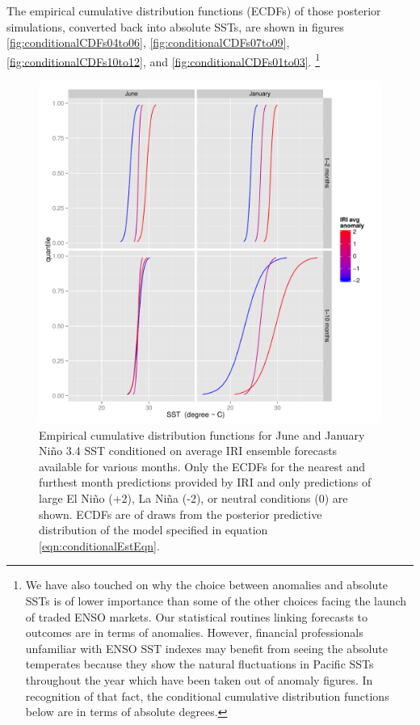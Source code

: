 \documentclass[authoryear]{article}
\begin{document}
The empirical cumulative distribution functions (ECDFs) of those posterior simulations, converted back into absolute SSTs, are shown in figures \ref{fig:conditionalCDFs04to06}, \ref{fig:conditionalCDFs07to09}, \ref{fig:conditionalCDFs10to12}, and \ref{fig:conditionalCDFs01to03}. \footnote{We have also touched on why the choice between anomalies and absolute SSTs is of lower importance than some of the other choices facing the launch of traded ENSO markets. Our statistical routines linking forecasts to outcomes are in terms of anomalies. However, financial professionals unfamiliar with ENSO SST indexes may benefit from seeing the absolute temperates because they show the natural fluctuations in Pacific SSTs throughout the year which have been taken out of anomaly figures. In recognition of that fact, the conditional cumulative distribution functions below are in terms of absolute degrees.}

\begin{figure}[!htbp]
  \includegraphics[width=\linewidth]{Pricingfigs/conditionalCDFsIllustrativeExamplesTradConfigSimple}
  \caption{Empirical cumulative distribution functions for June and January Ni\~no 3.4 SST conditioned on average IRI ensemble forecasts available for various months. Only the ECDFs for the nearest and furthest month predictions provided by IRI and only predictions of large El Ni\~no (+2), La Ni\~na (-2), or neutral conditions (0) are shown. ECDFs are of draws from the posterior predictive distribution of the model specified in equation \ref{eqn:conditionalEstEqn}.}
   \label{fig:conditionalCDFsIllustrativeExamplesTradConfigSimple}
\end{figure}
\end{document}
